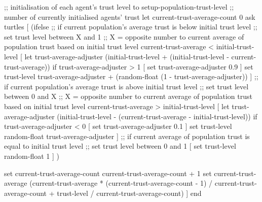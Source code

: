\begin{algorithm}[language=NetLogo, caption={Initialisation of the population's trust level}, label={algo:initialisation_trust_level}]
;; initialisation of each agent's trust level
to setup-population-trust-level
  ;; number of currently initialised agents' trust
  let current-trust-average-count 0
  ask turtles
  [
    (ifelse
      ;; if current population's average trust is below initial trust level
      ;; set trust level between X and 1
      ;; X = opposite number to current average of population trust based on initial trust level
      current-trust-average < initial-trust-level
      [
        let trust-average-adjuster (initial-trust-level + (initial-trust-level - current-trust-average))
        if trust-average-adjuster > 1
        [
          set trust-average-adjuster 0.9
        ]
        set trust-level trust-average-adjuster + (random-float (1 - trust-average-adjuster))
      ]
      ;; if current population's average trust is above initial trust level
      ;; set trust level between 0 and X
      ;; X = opposite number to current average of population trust based on initial trust level
      current-trust-average > initial-trust-level
      [
        let trust-average-adjuster (initial-trust-level - (current-trust-average - initial-trust-level))
        if trust-average-adjuster < 0
        [
          set trust-average-adjuster 0.1
        ]
        set trust-level random-float trust-average-adjuster
      ]
      ;; if current average of population trust is equal to initial trust level
      ;; set trust level between 0 and 1
      [
        set trust-level random-float 1
      ]
    )

    set current-trust-average-count current-trust-average-count + 1
    set current-trust-average (current-trust-average * (current-trust-average-count - 1) / current-trust-average-count + trust-level / current-trust-average-count)
  ]
end
\end{algorithm}

\newpage

